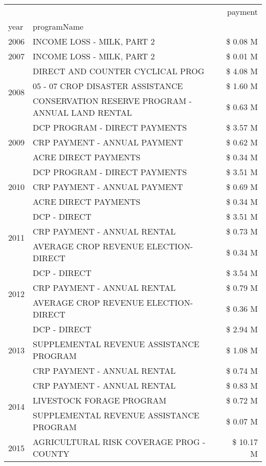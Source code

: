 \begin{tabular}{llr}
\toprule
 &  & payment \\
year & programName &  \\
\midrule
2006 & INCOME LOSS - MILK, PART 2 & \$ 0.08 M \\
\cline{1-3}
2007 & INCOME LOSS - MILK, PART 2 & \$ 0.01 M \\
\cline{1-3}
\multirow[t]{3}{*}{2008} & DIRECT AND COUNTER CYCLICAL PROG & \$ 4.08 M \\
 & 05 - 07 CROP DISASTER ASSISTANCE & \$ 1.60 M \\
 & CONSERVATION RESERVE PROGRAM - ANNUAL LAND RENTAL & \$ 0.63 M \\
\cline{1-3}
\multirow[t]{3}{*}{2009} & DCP PROGRAM - DIRECT PAYMENTS & \$ 3.57 M \\
 & CRP PAYMENT - ANNUAL PAYMENT & \$ 0.62 M \\
 & ACRE DIRECT PAYMENTS & \$ 0.34 M \\
\cline{1-3}
\multirow[t]{3}{*}{2010} & DCP PROGRAM - DIRECT PAYMENTS & \$ 3.51 M \\
 & CRP PAYMENT - ANNUAL PAYMENT & \$ 0.69 M \\
 & ACRE DIRECT PAYMENTS & \$ 0.34 M \\
\cline{1-3}
\multirow[t]{3}{*}{2011} & DCP - DIRECT & \$ 3.51 M \\
 & CRP PAYMENT - ANNUAL RENTAL & \$ 0.73 M \\
 & AVERAGE CROP REVENUE ELECTION-DIRECT & \$ 0.34 M \\
\cline{1-3}
\multirow[t]{3}{*}{2012} & DCP - DIRECT & \$ 3.54 M \\
 & CRP PAYMENT - ANNUAL RENTAL & \$ 0.79 M \\
 & AVERAGE CROP REVENUE ELECTION-DIRECT & \$ 0.36 M \\
\cline{1-3}
\multirow[t]{3}{*}{2013} & DCP - DIRECT & \$ 2.94 M \\
 & SUPPLEMENTAL REVENUE ASSISTANCE PROGRAM & \$ 1.08 M \\
 & CRP PAYMENT - ANNUAL RENTAL & \$ 0.74 M \\
\cline{1-3}
\multirow[t]{3}{*}{2014} & CRP PAYMENT - ANNUAL RENTAL & \$ 0.83 M \\
 & LIVESTOCK FORAGE PROGRAM & \$ 0.72 M \\
 & SUPPLEMENTAL REVENUE ASSISTANCE PROGRAM & \$ 0.07 M \\
\cline{1-3}
\multirow[t]{3}{*}{2015} & AGRICULTURAL RISK COVERAGE PROG - COUNTY & \$ 10.17 M \\

\end{tabular}
